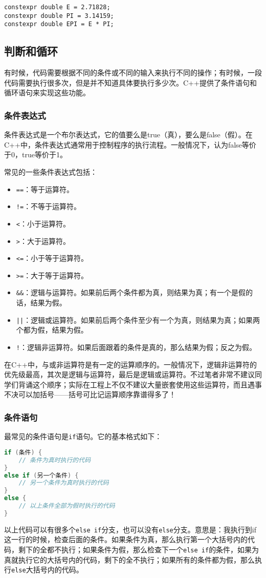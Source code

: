 \documentclass[../main.tex]{subfiles}
\begin{document}
\begin{lstlisting}
constexpr double E = 2.71828;
constexpr double PI = 3.14159;
constexpr double EPI = E * PI;
\end{lstlisting}

\subsection{判断和循环}
有时候，代码需要根据不同的条件或不同的输入来执行不同的操作；有时候，一段代码需要执行很多次，但是并不知道具体要执行多少次。C++提供了条件语句和循环语句来实现这些功能。

\subsubsection{条件表达式}
条件表达式是一个布尔表达式，它的值要么是true（真），要么是false（假）。在C++中，条件表达式通常用于控制程序的执行流程。一般情况下，认为false等价于0，true等价于1。

常见的一些条件表达式包括：
\begin{itemize}
  \item \texttt{==}：等于运算符。
  \item \texttt{!=}：不等于运算符。
  \item \texttt{<}：小于运算符。
  \item \texttt{>}：大于运算符。
  \item \texttt{<=}：小于等于运算符。
  \item \texttt{>=}：大于等于运算符。
  \item \texttt{\&\&}：逻辑与运算符。如果前后两个条件都为真，则结果为真；有一个是假的话，结果为假。
  \item \texttt{||}：逻辑或运算符。如果前后两个条件至少有一个为真，则结果为真；如果两个都为假，结果为假。
  \item \texttt{!}：逻辑非运算符。如果后面跟着的条件是真的，那么结果为假；反之为假。
\end{itemize}

在C++中，与或非运算符是有一定的运算顺序的。一般情况下，逻辑非运算符的优先级最高，其次是逻辑与运算符，最后是逻辑或运算符。不过笔者非常不建议同学们背诵这个顺序；实际在工程上不仅不建议大量嵌套使用这些运算符，而且遇事不决可以加括号——括号可比记运算顺序靠谱得多了！

\subsubsection{条件语句}

最常见的条件语句是\texttt{if}语句。它的基本格式如下：
\begin{lstlisting}[language=C++]
if (条件) {
    // 条件为真时执行的代码
}
else if (另一个条件) {
    // 另一个条件为真时执行的代码
}
else {
    // 以上条件全部为假时执行的代码
}
\end{lstlisting}
以上代码可以有很多个\texttt{else if}分支，也可以没有\texttt{else}分支。意思是：我执行到if这一行的时候，检查后面的条件。如果条件为真，那么执行第一个大括号内的代码，剩下的全都不执行；如果条件为假，那么检查下一个\texttt{else if}的条件，如果为真就执行它的大括号内的代码，剩下的全不执行；如果所有的条件都为假，那么执行\texttt{else}大括号内的代码。
\end{document}
